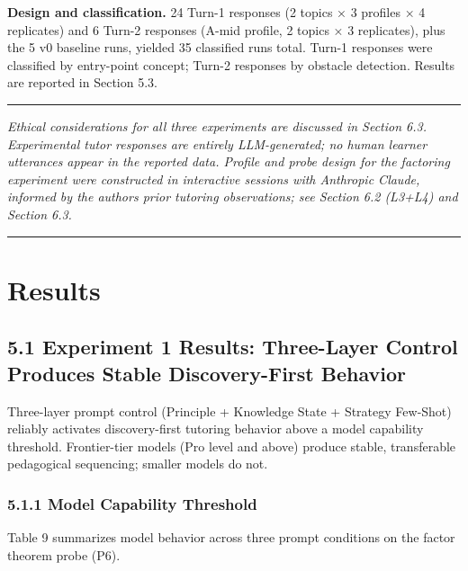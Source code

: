 \documentclass[
]{article}
\begin{document}
\textbf{Design and classification.} 24 Turn-1 responses (2 topics × 3 profiles × 4 replicates) and 6 Turn-2 responses (A-mid profile, 2 topics × 3 replicates), plus the 5 v0 baseline runs, yielded 35 classified runs total. Turn-1 responses were classified by entry-point concept; Turn-2 responses by obstacle detection. Results are reported in Section 5.3.

\begin{center}\rule{0.5\linewidth}{0.5pt}\end{center}

\emph{Ethical considerations for all three experiments are discussed in Section 6.3. Experimental tutor responses are entirely LLM-generated; no human learner utterances appear in the reported data. Profile and probe design for the factoring experiment were constructed in interactive sessions with Anthropic Claude, informed by the author\textquotesingle s prior tutoring observations; see Section 6.2 (L3+L4) and Section 6.3.}

\begin{center}\rule{0.5\linewidth}{0.5pt}\end{center}

\section{Results}\label{results}

\subsection{5.1 Experiment 1 Results: Three-Layer Control Produces Stable Discovery-First Behavior}\label{51-experiment-1-results-three-layer-control-produces-stable-discovery-first-behavior}

Three-layer prompt control (Principle + Knowledge State + Strategy Few-Shot) reliably activates discovery-first tutoring behavior above a model capability threshold. Frontier-tier models (Pro level and above) produce stable, transferable pedagogical sequencing; smaller models do not.

\subsubsection{5.1.1 Model Capability Threshold}\label{511-model-capability-threshold}

Table 9 summarizes model behavior across three prompt conditions on the factor theorem probe (P6).
\end{document}
